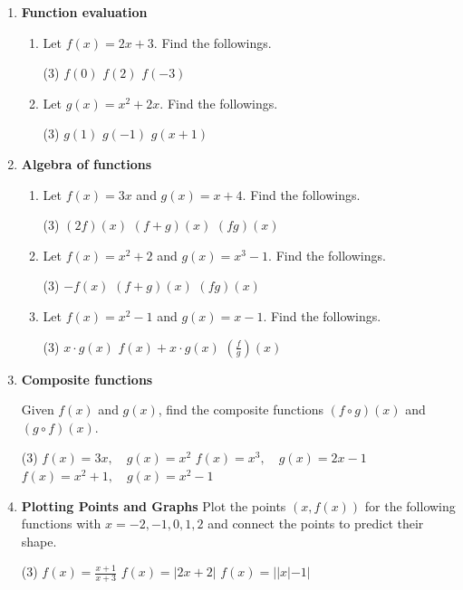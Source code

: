 \begin{enumerate}
\item \textbf{Function evaluation}

\begin{enumerate}
\item Let $f(x) = 2x+3$. Find the followings.
\begin{tasks}[after-skip = 25pt](3)
\task $f(0)$
\task $f(2)$
\task $f(-3)$
\end{tasks}
\item Let $g(x) = x^2+2x$. Find the followings.
\begin{tasks}[after-skip = 25pt](3)
\task $g(1)$
\task $g(-1)$
\task $g(x+1)$
\end{tasks}
\end{enumerate}


\item \textbf{Algebra of functions} 

\begin{enumerate}
\item Let $f(x) = 3x$ and $g(x) = x+4$. Find the followings.
\begin{tasks}[after-skip = 35pt](3)
\task $(2f)(x)$
\task $(f + g)(x)$
\task $(fg)(x)$
\end{tasks}
\item Let $f(x) = x^2+2$ and $g(x) = x^3-1$. Find the followings.
\begin{tasks}[after-skip = 35pt](3)
\task $-f(x)$
\task $(f+g)(x)$
\task $(fg)(x)$
\end{tasks}
\item Let $f(x) = x^2-1$ and $g(x) = x-1$. Find the followings.
\begin{tasks}[after-skip = 35pt](3)
\task $x \cdot g(x)$
\task $f(x) + x \cdot g(x)$
\task $\left(\frac{f}{g}\right)(x)$
\end{tasks}
\end{enumerate}

\item \textbf{Composite functions} 

Given $f(x)$ and $g(x)$, find the composite functions $(f \circ g)(x)$ and $(g \circ f)(x)$.
\begin{tasks}[after-skip = 45pt](3)
\task $f(x) = 3x, \quad g(x) = x^2$
\task $f(x) = x^3, \quad g(x) = 2x-1$
\task $f(x) = x^2+1, \quad g(x) = x^2-1$
\end{tasks}

\newpage
\item \textbf{Plotting Points and Graphs} Plot the points $(x,f(x))$ for the following functions with $x=-2,-1,0,1,2$ and connect the points to predict their shape.
\begin{tasks}[after-item-skip = 110pt, after-skip = 110pt](3)
\task $f(x) = \frac{x+1}{x+3}$
\task $f(x) = |2x+2|$
\task $f(x) = ||x|-1|$
\end{tasks}


\end{enumerate}
